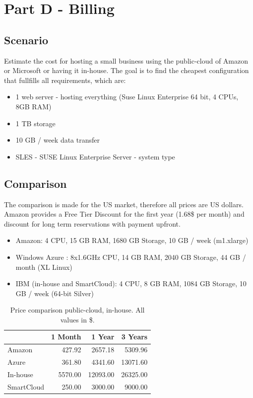 \documentclass[paper=a4, fontsize=11pt]{scrartcl} %
\numberwithin{equation}{section} %
\numberwithin{figure}{section} %
\numberwithin{table}{section} %
\begin{document}
\newpage

\section{Part D - Billing}

\subsection{Scenario}

Estimate the cost for hosting a small business using the public-cloud of Amazon or Microsoft or having it in-house. The goal is to find the cheapest configuration that fullfills all requirements, which are:

\begin{itemize}
	\item 1 web server - hosting everything (Suse Linux Enterprise 64 bit, 4 CPUs, 8GB RAM)
	\item 1 TB storage
	\item 10 GB / week data transfer
	\item SLES - SUSE Linux Enterprise Server - system type
\end{itemize}

\subsection{Comparison}

The comparison is made for the US market, therefore all prices are US dollars.
Amazon provides a Free Tier Discount for the first year (1.68\$ per month) and discount for long term reservations with payment upfront.

\begin{itemize}
	\item Amazon: 4 CPU, 15 GB RAM, 1680 GB Storage, 10 GB / week (m1.xlarge)
	\item Windows Azure : 8x1.6GHz CPU, 14 GB RAM, 2040 GB Storage, 44 GB / month (XL Linux)
	\item IBM (in-house and SmartCloud): 4 CPU, 8 GB RAM, 1084 GB Storage, 10 GB / week (64-bit Silver)
\end{itemize}

\begin{table}
	\centering
	\begin{tabular}{| l | r | r | r |}
		\hline
		& 1 Month & 1 Year & 3 Years \\
		\hline
		Amazon & 427.92 & 2657.18 & 5309.96 \\
		\hline
		Azure & 361.80 & 4341.60 & 13071.60 \\
		\hline
		In-house & 5570.00 & 12093.00 & 26325.00 \\
		\hline
		SmartCloud & 250.00 & 3000.00 & 9000.00 \\
		\hline
	\end{tabular}
	\caption{Price comparison public-cloud, in-house. All values in \$.}
	\label{tab:pricetable}
\end{table}
\end{document}
